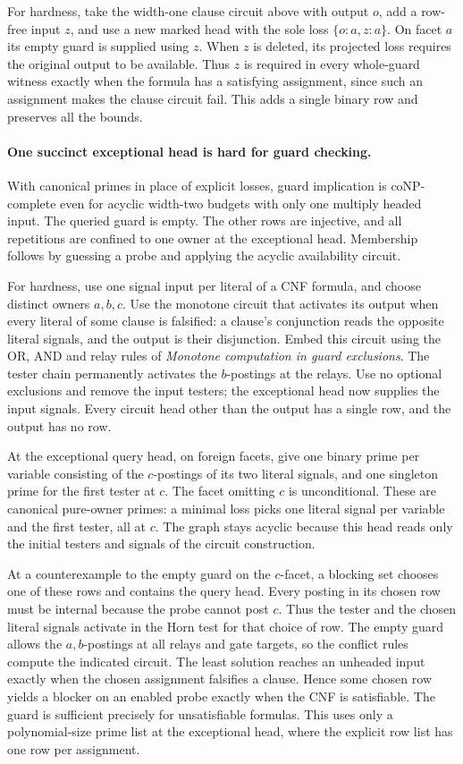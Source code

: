 For hardness, take the width-one clause
circuit above with output $o$, add a row-free
input $z$, and use a new marked head with the
sole loss $\{o:a,z:a\}$. On facet $a$ its
empty guard is supplied using $z$. When
$z$ is deleted, its projected loss requires
the original output to be available. Thus
$z$ is required in every whole-guard witness
exactly when the formula has a satisfying
assignment, since such an assignment makes
the clause circuit fail. This adds a single
binary row and preserves all the bounds.

\paragraph{One succinct exceptional head is hard for guard checking.}
With canonical primes in place of explicit losses,
guard implication is coNP-complete even for acyclic
width-two budgets with only one multiply headed input.
The queried guard is empty. The other rows are
injective, and all repetitions are confined to one
owner at the exceptional head. Membership follows
by guessing a probe and applying the acyclic
availability circuit.

For hardness, use one signal input per literal of a
CNF formula, and choose distinct owners $a,b,c$.
Use the monotone circuit that activates its output
when every literal of some clause is falsified:
a clause's conjunction reads the opposite literal
signals, and the output is their disjunction. Embed
this circuit using the OR, AND and relay rules of
\emph{Monotone computation in guard exclusions}.
The tester chain permanently activates the
$b$-postings at the relays. Use no optional
exclusions and remove the input testers; the
exceptional head now supplies the input signals.
Every circuit head other than the output has a
single row, and the output has no row.

At the exceptional query head, on foreign facets,
give one binary prime per variable consisting of
the $c$-postings of its two literal signals, and
one singleton prime for the first tester at $c$.
The facet omitting $c$ is unconditional. These
are canonical pure-owner primes: a minimal loss
picks one literal signal per variable and the
first tester, all at $c$. The graph stays acyclic
because this head reads only the initial testers
and signals of the circuit construction.

At a counterexample to the empty guard on the
$c$-facet, a blocking set chooses one of these
rows and contains the query head. Every posting
in its chosen row must be internal because the
probe cannot post $c$. Thus the tester and the
chosen literal signals activate in the Horn
test for that choice of row. The empty guard
allows the $a,b$-postings at all relays and
gate targets, so the conflict rules compute
the indicated circuit. The least solution
reaches an unheaded input exactly when the
chosen assignment falsifies a clause. Hence
some chosen row yields a blocker on an enabled
probe exactly when the CNF is satisfiable.
The guard is sufficient precisely for
unsatisfiable formulas. This uses only a
polynomial-size prime list at the exceptional
head, where the explicit row list has one row
per assignment.

